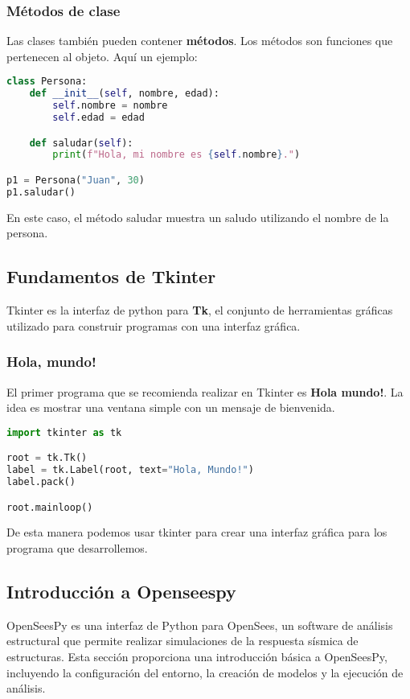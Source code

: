 \documentclass[conference]{IEEEtran}
\begin{document}
		\subsubsection{Métodos de clase}
		Las clases también pueden contener \textbf{métodos}. Los métodos son funciones
		que pertenecen al objeto. Aquí un ejemplo:
		\begin{lstlisting}[language=Python,basicstyle=\small,caption=Creación de un método en Python]
class Persona:
	def __init__(self, nombre, edad):
		self.nombre = nombre
		self.edad = edad

	def saludar(self):
		print(f"Hola, mi nombre es {self.nombre}.")

p1 = Persona("Juan", 30)
p1.saludar()
		\end{lstlisting}
		En este caso, el método saludar muestra un saludo utilizando el nombre de la persona.
	\subsection{Fundamentos de Tkinter}
	Tkinter es la interfaz de python para \textbf{Tk}, el conjunto
	de herramientas gráficas utilizado para construir programas con
	una interfaz gráfica.
	\subsubsection{Hola, mundo!}
	El primer programa que se recomienda realizar en Tkinter 
	es \textbf{Hola mundo!}. La idea es mostrar una ventana
	simple con un mensaje de bienvenida.
	\begin{lstlisting}[language=Python,basicstyle=\small,caption=Creación de un programa en Tkinter]
import tkinter as tk

root = tk.Tk()
label = tk.Label(root, text="Hola, Mundo!")
label.pack()

root.mainloop()
	\end{lstlisting}
	De esta manera podemos usar tkinter para crear una interfaz gráfica
	para los programa que desarrollemos.
	\subsection{Introducción a Openseespy}
	OpenSeesPy es una interfaz de Python para OpenSees, 
	un software de análisis estructural que permite realizar 
	simulaciones de la respuesta sísmica de estructuras. 
	Esta sección proporciona una introducción básica a OpenSeesPy, 
	incluyendo la configuración del entorno, la creación de modelos y 
	la ejecución de análisis.
\end{document}
